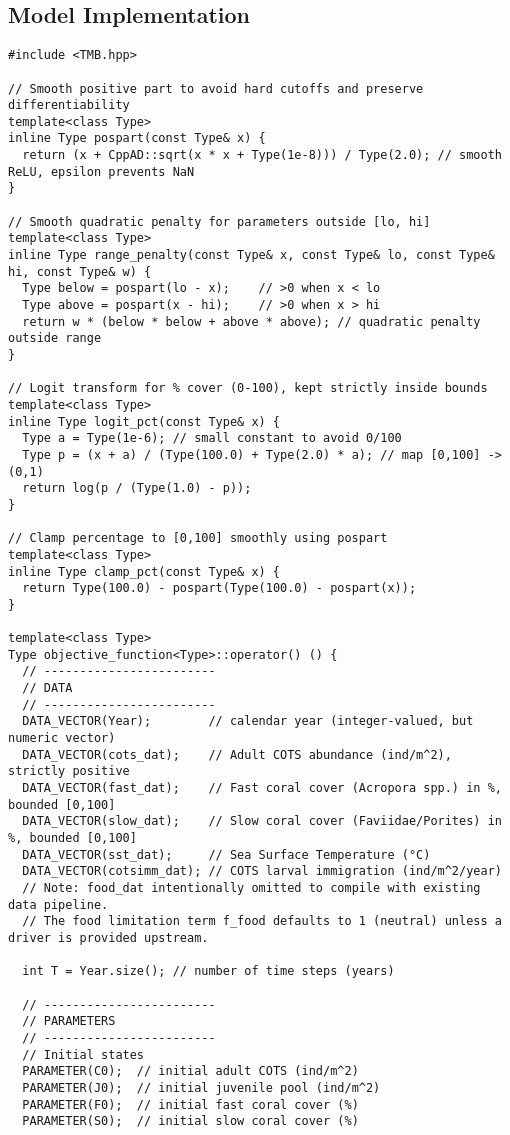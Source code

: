 \subsection{Model Implementation}
\begin{lstlisting}
#include <TMB.hpp>

// Smooth positive part to avoid hard cutoffs and preserve differentiability
template<class Type>
inline Type pospart(const Type& x) {
  return (x + CppAD::sqrt(x * x + Type(1e-8))) / Type(2.0); // smooth ReLU, epsilon prevents NaN
}

// Smooth quadratic penalty for parameters outside [lo, hi]
template<class Type>
inline Type range_penalty(const Type& x, const Type& lo, const Type& hi, const Type& w) {
  Type below = pospart(lo - x);    // >0 when x < lo
  Type above = pospart(x - hi);    // >0 when x > hi
  return w * (below * below + above * above); // quadratic penalty outside range
}

// Logit transform for % cover (0-100), kept strictly inside bounds
template<class Type>
inline Type logit_pct(const Type& x) {
  Type a = Type(1e-6); // small constant to avoid 0/100
  Type p = (x + a) / (Type(100.0) + Type(2.0) * a); // map [0,100] -> (0,1)
  return log(p / (Type(1.0) - p));
}

// Clamp percentage to [0,100] smoothly using pospart
template<class Type>
inline Type clamp_pct(const Type& x) {
  return Type(100.0) - pospart(Type(100.0) - pospart(x));
}

template<class Type>
Type objective_function<Type>::operator() () {
  // ------------------------
  // DATA
  // ------------------------
  DATA_VECTOR(Year);        // calendar year (integer-valued, but numeric vector)
  DATA_VECTOR(cots_dat);    // Adult COTS abundance (ind/m^2), strictly positive
  DATA_VECTOR(fast_dat);    // Fast coral cover (Acropora spp.) in %, bounded [0,100]
  DATA_VECTOR(slow_dat);    // Slow coral cover (Faviidae/Porites) in %, bounded [0,100]
  DATA_VECTOR(sst_dat);     // Sea Surface Temperature (°C)
  DATA_VECTOR(cotsimm_dat); // COTS larval immigration (ind/m^2/year)
  // Note: food_dat intentionally omitted to compile with existing data pipeline.
  // The food limitation term f_food defaults to 1 (neutral) unless a driver is provided upstream.

  int T = Year.size(); // number of time steps (years)

  // ------------------------
  // PARAMETERS
  // ------------------------
  // Initial states
  PARAMETER(C0);  // initial adult COTS (ind/m^2)
  PARAMETER(J0);  // initial juvenile pool (ind/m^2)
  PARAMETER(F0);  // initial fast coral cover (%)
  PARAMETER(S0);  // initial slow coral cover (%)


\end{lstlisting}
